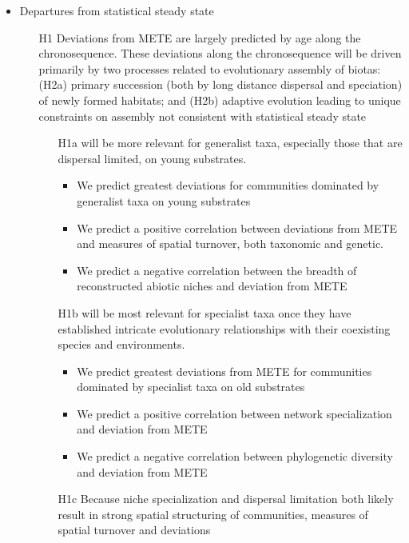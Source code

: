 \documentclass[11pt]{article}
\begin{document}
\begin{itemize}
\item Departures from statistical steady state
  \begin{itemize}
  \item[H1] Deviations from METE are largely predicted by age
    along the chronosequence. These deviations along the
    chronosequence will be driven primarily by two processes
    related to evolutionary assembly of biotas: (H2a) primary
    succession (both by long distance dispersal and speciation) of
    newly formed habitats; and (H2b) adaptive evolution leading to
    unique constraints on assembly not consistent with statistical
    steady state
    \begin{itemize}
    \item[H1a] will be more relevant for generalist taxa,
      especially those that are dispersal limited, on young
      substrates. 
      \begin{itemize}
      \item We predict greatest deviations for communities
        dominated by generalist taxa on young substrates
      \item We predict a positive correlation between deviations
        from METE and measures of spatial turnover, both taxonomic
        and genetic.
      \item We predict a negative correlation between the breadth
        of reconstructed abiotic niches and deviation from METE
      \end{itemize}
    \item[H1b] will be most relevant for specialist taxa once they
      have established intricate evolutionary relationships with
      their coexisting species and environments.
      \begin{itemize}
      \item We predict greatest deviations from METE for
        communities dominated by specialist taxa on old substrates
      \item We predict a positive correlation between network
        specialization and deviation from METE
      \item We predict a negative correlation between phylogenetic
        diversity and deviation from METE
      \end{itemize}
    \item[H1c]  Because niche specialization and dispersal
      limitation both likely result in strong spatial structuring
      of communities, measures of spatial turnover and deviations

\end{itemize}
\end{itemize}
\end{itemize}
\end{document}
